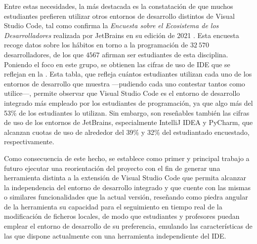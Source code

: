 Entre estas necesidades, la más destacada es la constatación de que muchos estudiantes prefieren utilizar otros entornos de desarrollo distintos de Visual Studio Code, tal como confirma la \textit{Encuesta sobre el Ecosistema de los Desarrolladores} realizada por JetBrains en su edición de 2021 \cite{Conc_EncuestaJetBrains}. Esta encuesta recoge datos sobre los hábitos en torno a la programación de $32\ 570$ desarrolladores, de los que $4567$ afirman ser estudiantes de esta disciplina. Poniendo el foco en este grupo, se obtienen las cifras de uso de IDE que se reflejan en la . Esta tabla, que refleja cuántos estudiantes utilizan cada uno de los entornos de desarrollo que muestra ---pudiendo cada uno contestar tantos como utilice---, permite observar que Visual Studio Code es el entorno de desarrollo integrado más empleado por los estudiantes de programación, ya que algo más del 53\% de los estudiantes lo utilizan. Sin embargo, son reseñables también las cifras de uso de los entornos de JetBrains, especialmente IntelliJ IDEA y PyCharm, que alcanzan cuotas de uso de alrededor del 39\% y 32\% del estudiantado encuestado, respectivamente.



Como consecuencia de este hecho, se establece como primer y principal trabajo a futuro ejecutar una reorientación del proyecto con el fin de generar una herramienta distinta a la extensión de Visual Studio Code que permita alcanzar la independencia del entorno de desarrollo integrado y que cuente con las mismas o similares funcionalidades que la actual versión, reseñando como piedra angular de la herramienta su capacidad para el seguimiento en tiempo real de la modificación de ficheros locales, de modo que estudiantes y profesores puedan emplear el entorno de desarrollo de su preferencia, emulando las características de las que dispone actualmente con una herramienta independiente del IDE.

